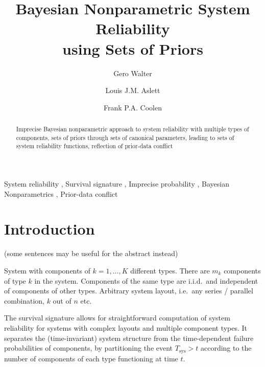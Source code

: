 \documentclass[12pt, a4paper]{elsarticle}
\def\Tsys{T_\text{sys}}
\begin{document}

\begin{frontmatter}
\title{Bayesian Nonparametric System Reliability\\ using Sets of Priors}

\author[ein]{Gero Walter}
\author[oxf]{Louis J.M. Aslett}
\author[dur]{Frank P.A. Coolen}

\address[ein]{School of Industrial Engineering, Eindhoven University of Technology, Eindhoven, NL}
\address[oxf]{Department of Statistics, University of Oxford, Oxford, UK}
\address[dur]{Department of Mathematical Sciences, Durham University, Durham, UK}


\begin{abstract}
Imprecise Bayesian nonparametric approach to system reliability with multiple types of components,
sets of priors through sets of canonical parameters,
leading to sets of system reliability functions,
reflection of prior-data conflict
\end{abstract}

\begin{keyword}
System reliability \sep
Survival signature \sep
Imprecise probability \sep
Bayesian Nonparametrics \sep
Prior-data conflict
\end{keyword}
\end{frontmatter}



\section{Introduction}

(some sentences may be useful for the abstract instead)

System with components of $k=1,\ldots,K$ different types.
There are $m_k$ components of type $k$ in the system.
Components of the same type are i.i.d.\ and independent of components of other types.
Arbitrary system layout, i.e.\ any series / parallel combination, $k$ out of $n$ etc.

The survival signature allows for straightforward computation of system reliability
for systems with complex layouts and multiple component types.
It separates the (time-invariant) system structure from the time-dependent failure probabilities of components,
by partitioning the event $\Tsys > t$ according to the number of components of each type functioning at time $t$.
\end{document}
